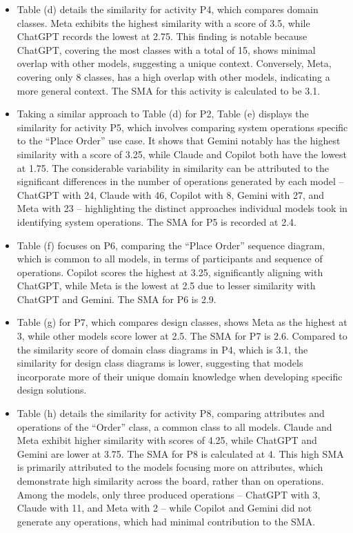 \begin{itemize}
	\item Table (d) details the similarity for activity P4, which compares domain classes. Meta exhibits the highest similarity with a score of 3.5, while ChatGPT records the lowest at 2.75. This finding is notable because ChatGPT, covering the most classes with a total of 15, shows minimal overlap with other models, suggesting a unique context. Conversely, Meta, covering only 8 classes, has a high overlap with other models, indicating a more general context. The SMA for this activity is calculated to be 3.1.
	
	\item Taking a similar approach to Table (d) for P2, Table (e) displays the similarity for activity P5, which involves comparing system operations specific to the ``Place Order'' use case. It shows that Gemini notably has the highest similarity with a score of 3.25, while Claude and Copilot both have the lowest at 1.75. The considerable variability in similarity can be attributed to the significant differences in the number of operations generated by each model -- ChatGPT with 24, Claude with 46, Copilot with 8, Gemini with 27, and Meta with 23 -- highlighting the distinct approaches individual models took in identifying system operations. The SMA for P5 is recorded at 2.4.
	
	\item Table (f) focuses on P6, comparing the ``Place Order'' sequence diagram, which is common to all models, in terms of participants and sequence of operations. Copilot scores the highest at 3.25, significantly aligning with ChatGPT, while Meta is the lowest at 2.5 due to lesser similarity with ChatGPT and Gemini. The SMA for P6 is 2.9.
	
	\item Table (g) for P7, which compares design classes, shows Meta as the highest at 3, while other models score lower at 2.5. The SMA for P7 is 2.6. Compared to the similarity score of domain class diagrams in P4, which is 3.1, the similarity for design class diagrams is lower, suggesting that models incorporate more of their unique domain knowledge when developing specific design solutions.
	
	\item Table (h) details the similarity for activity P8, comparing attributes and operations of the ``Order'' class, a common class to all models. Claude and Meta exhibit higher similarity with scores of 4.25, while ChatGPT and Gemini are lower at 3.75. The SMA for P8 is calculated at 4. This high SMA is primarily attributed to the models focusing more on attributes, which demonstrate high similarity across the board, rather than on operations. Among the models, only three produced operations -- ChatGPT with 3, Claude with 11, and Meta with 2 -- while Copilot and Gemini did not generate any operations, which had minimal contribution to the SMA. 
	

\end{itemize}
